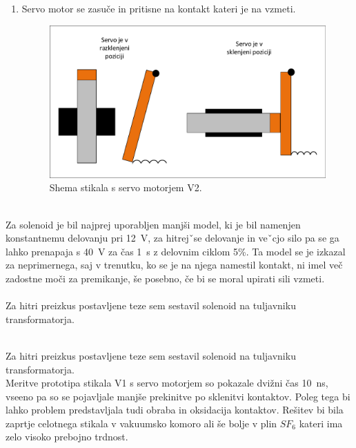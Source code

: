 \documentclass[a4paper,twoside,openright,12pt,Slovene]{book}
\begin{document}
\begin{enumerate}
    \item  Servo motor se zasuče in pritisne na kontakt kateri je na vzmeti.
    \begin{figure}[H]
        \centering
        \includegraphics[width=1\columnwidth]{Sheme/StikaloServoVerzija2.pdf}
        \caption{\label{StikaloServoVerzija2} Shema stikala s servo motorjem V2.}
    \end{figure}
\end{enumerate}


    ~\\Za solenoid je bil najprej uporabljen manjši model, ki je bil namenjen konstantnemu delovanju pri \SI{12}{\volt}, za hitrejˇse delovanje in veˇcjo silo pa se ga lahko prenapaja s \SI{40}{\volt} za čas  \SI{1}{\second} z delovnim ciklom 5\%. Ta model se je izkazal za neprimernega, saj v trenutku, ko se je na njega namestil kontakt, ni imel več zadostne moči za premikanje, še posebno, če bi se moral upirati sili vzmeti. 
~\\ 
~\\Za hitri preizkus postavljene teze sem sestavil solenoid na tuljavniku transformatorja.
    
    ~\\Za hitri preizkus postavljene teze sem sestavil solenoid na tuljavniku
transformatorja. 
~\\Meritve prototipa stikala V1 s servo motorjem so pokazale dvižni čas \SI{10}{\nano\second}, vseeno pa so se pojavljale manjše prekinitve po sklenitvi kontaktov. Poleg tega bi lahko problem predstavljala tudi obraba in oksidacija kontaktov. Rešitev bi bila zaprtje celotnega stikala v vakuumsko komoro ali še bolje v plin $SF_{6}$ kateri ima zelo visoko prebojno trdnost.
    
\end{document}
